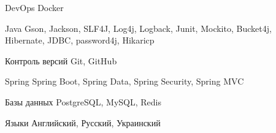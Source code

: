 

\begin{cvskills}

  \cvskill
    {DevOps} %
    {Docker} %

  \cvskill
    {Java} %
    {Gson, Jackson, SLF4J, Log4j, Logback, Junit, Mockito, Bucket4j, Hibernate, JDBC, password4j, Hikaricp} %

  \cvskill
    {Контроль версий} %
    {Git, GitHub}

  \cvskill
    {Spring} %
    {Spring Boot, Spring Data, Spring Security, Spring MVC} %

  \cvskill
    {Базы данных} %
    {PostgreSQL, MySQL, Redis} %

  \cvskill
    {Языки} %
    {Английский, Русский, Украинский} %

\end{cvskills}
